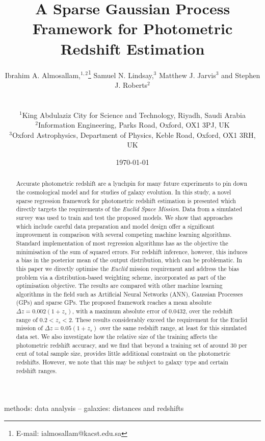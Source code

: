 \documentclass[useAMS,usenatbib,fleqn]{mn2e}
\title[A Sparse Gaussian Process Framework for Photometric Redshift Estimation]{A Sparse Gaussian Process Framework for Photometric Redshift Estimation}
\author[Almosallam et al.]
{\parbox{\textwidth}{Ibrahim A. Almosallam,$^{1,2}$\thanks{E-mail: ialmosallam@kacst.edu.sa} Samuel N. Lindsay,$^{3}$ Matthew J. Jarvis$^{3}$ and Stephen J. Roberts$^{2}$
}
\vspace{0.4cm}\\
\parbox{\textwidth}{
$^1$King Abdulaziz City for Science and Technology, Riyadh, Saudi Arabia\\
$^2$Information Engineering, Parks Road, Oxford, OX1 3PJ, UK\\
$^3$Oxford Astrophysics, Department of Physics, Keble Road, Oxford, OX1 3RH, UK\\
}}
\begin{document}
\date{\today}

\pagerange{\pageref{firstpage}--\pageref{lastpage}} 

\maketitle

\label{firstpage}

\begin{abstract}
Accurate photometric redshift are a lynchpin for many future experiments to pin down the cosmological model and for studies of galaxy evolution. In this study, a novel sparse regression framework for photometric redshift estimation is presented which directly targets the requirements of the {\em Euclid Space Mission}. Data from a simulated survey was used to train and test the proposed models. We show that approaches which include careful data preparation and model design offer a significant improvement in comparison with several competing machine learning algorithms. Standard implementation of most regression algorithms has as the objective the minimisation of the sum of squared errors. For redshift inference, however, this induces a bias in the posterior mean of the output distribution, which can be problematic. In this paper we directly optimise the {\em Euclid} mission requirement and address the bias problem via a distribution-based weighting scheme, incorporated as part of the optimisation objective. The results are compared with other machine learning algorithms in the field such as Artificial Neural Networks (ANN), Gaussian Processes (GPs) and sparse GPs. The proposed framework reaches a mean absolute $\Delta z = 0.002(1+z_{s})$, with a maximum absolute error of 0.0432, over the redshift range of $0.2 < z_{s} < 2$. These results considerably exceed the requirement for the Euclid mission of $\Delta z = 0.05(1+z_{s})$ over the same redshift range, at least for this simulated data set. We also investigate how the relative  size of the training affects the photometric redshift accuracy, and we find that beyond a training set of around 30 per cent of total sample size, provides little additional constraint on the photometric redshifts. However, we note that this may be subject to galaxy type and certain redshift ranges.
\end{abstract}

\begin{keywords}
methods: data analysis -- galaxies: distances and redshifts
\end{keywords}
\end{document}
